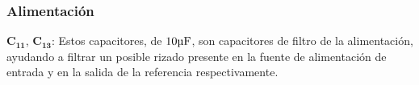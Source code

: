 \subsubsection{Alimentación}

$\bm{C_{11}}$, $\bm{C_{13}}$: Estos capacitores, de $10 \si[per-mode=symbol]{\micro\farad}$, son capacitores de filtro de la alimentación, ayudando a filtrar un posible rizado presente en la fuente de alimentación de entrada y en la salida de la referencia respectivamente.\\



\clearpage
